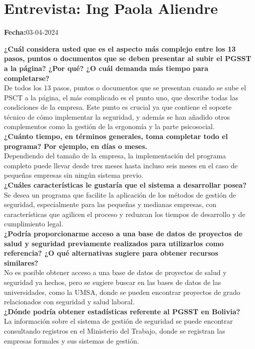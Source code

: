 \chapter{Entrevista: Ing Paola Aliendre}
\label{sec:entrevista01}
\noindent
\textbf{Fecha:}03-04-2024

\noindent
\textbf{¿Cuál considera usted que es el aspecto más complejo entre los 13 pasos, puntos o documentos que se deben presentar al subir el PGSST a la página? ¿Por qué? ¿O cuál demanda más tiempo para completarse?}\\
De todos los 13 pasos, puntos o documentos que se presentan cuando se sube el PSCT a la página, el más complicado es el punto uno, que describe todas las condiciones de la empresa. Este punto es crucial ya que contiene el soporte técnico de cómo implementar la seguridad, y además se han añadido otros complementos como la gestión de la ergonomía y la parte psicosocial.
\\
\noindent
\textbf{¿Cuánto tiempo, en términos generales, toma completar todo el programa? Por ejemplo, en días o meses.}\\
Dependiendo del tamaño de la empresa, la implementación del programa completo puede llevar desde tres meses hasta incluso seis meses en el caso de pequeñas empresas sin ningún sistema previo.
\\
\noindent
\textbf{¿Cuáles características le gustaría que el sistema a desarrollar posea?}\\
Se desea un programa que facilite la aplicación de los métodos de gestión de seguridad, especialmente para las pequeñas y medianas empresas, con características que agilicen el proceso y reduzcan los tiempos de desarrollo y de cumplimiento legal.
\\
\noindent
\textbf{¿Podría proporcionarme acceso a una base de datos de proyectos de salud y seguridad previamente realizados para utilizarlos como referencia? ¿O qué alternativas sugiere para obtener recursos similares?}\\
No es posible obtener acceso a una base de datos de proyectos de salud y seguridad ya hechos, pero se sugiere buscar en las bases de datos de las universidades, como la UMSA, donde se pueden encontrar proyectos de grado relacionados con seguridad y salud laboral.
\\
\noindent
\textbf{¿Dónde podría obtener estadísticas referente al PGSST en Bolivia?}\\
La información sobre el sistema de gestión de seguridad se puede encontrar consultando registros en el Ministerio del Trabajo, donde se registran las empresas formales y sus sistemas de gestión.

